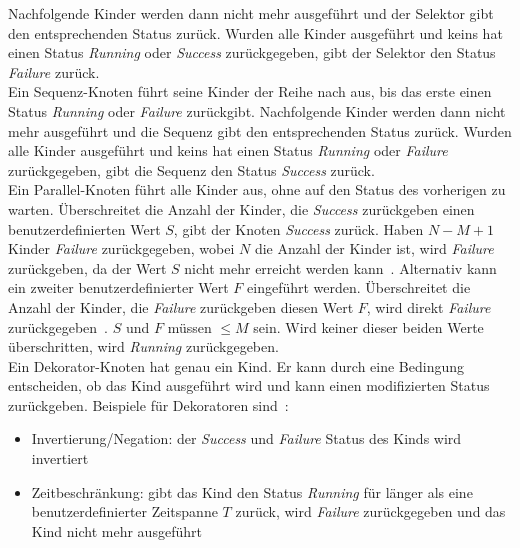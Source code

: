 Nachfolgende Kinder werden dann nicht mehr ausgeführt und der Selektor gibt den entsprechenden Status zurück.
Wurden alle Kinder ausgeführt und keins hat einen Status \emph{Running} oder \emph{Success} zurückgegeben, gibt der Selektor den Status \emph{Failure} zurück.\\
Ein Sequenz-Knoten führt seine Kinder der Reihe nach aus, bis das erste einen Status \emph{Running} oder \emph{Failure} zurückgibt.
Nachfolgende Kinder werden dann nicht mehr ausgeführt und die Sequenz gibt den entsprechenden Status zurück.
Wurden alle Kinder ausgeführt und keins hat einen Status \emph{Running} oder \emph{Failure} zurückgegeben, gibt die Sequenz den Status \emph{Success} zurück.\\
Ein Parallel-Knoten führt alle Kinder aus, ohne auf den Status des vorherigen zu warten.
Überschreitet die Anzahl der Kinder, die \emph{Success} zurückgeben einen benutzerdefinierten Wert $S$, gibt der Knoten \emph{Success} zurück.
Haben $N-M+1$ Kinder \emph{Failure} zurückgegeben, wobei $N$ die Anzahl der Kinder ist, wird \emph{Failure} zurückgeben, da der Wert $S$ nicht mehr erreicht werden kann~\cite{bt_book}.
Alternativ kann ein zweiter benutzerdefinierter Wert $F$ eingeführt werden.
Überschreitet die Anzahl der Kinder, die \emph{Failure} zurückgeben diesen Wert $F$, wird direkt \emph{Failure} zurückgegeben~\cite{bt_1}.
$S$ und $F$ müssen $\leq M$ sein.
Wird keiner dieser beiden Werte überschritten, wird \emph{Running} zurückgegeben.\\
Ein Dekorator-Knoten hat genau ein Kind.
Er kann durch eine Bedingung entscheiden, ob das Kind ausgeführt wird und kann einen modifizierten Status zurückgeben.
Beispiele für Dekoratoren sind~\cite{bt_book}:
\begin{itemize}
    \item Invertierung/Negation: der \emph{Success} und \emph{Failure} Status des Kinds wird invertiert
    \item Zeitbeschränkung: gibt das Kind den Status \emph{Running} für länger als eine benutzerdefinierter Zeitspanne $T$ zurück, wird \emph{Failure} zurückgegeben und das Kind nicht mehr ausgeführt
\end{itemize}

